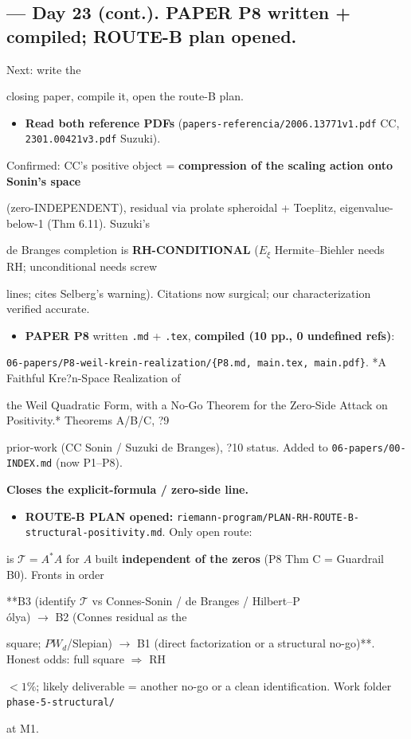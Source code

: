 \documentclass[10pt]{article}
\begin{document}
\subsection*{ --- Day 23 (cont.). PAPER P8 written + compiled; ROUTE-B plan opened.}
Next: write the\par
closing paper, compile it, open the route-B plan.\par
\begin{itemize}
\item \textbf{Read both reference PDFs} (\texttt{papers-referencia/2006.13771v1.pdf} CC, \texttt{2301.00421v3.pdf} Suzuki).
\end{itemize}
  Confirmed: CC's positive object = \textbf{compression of the scaling action onto Sonin's space}\par
  (zero-INDEPENDENT), residual via prolate spheroidal + Toeplitz, eigenvalue-below-1 (Thm 6.11). Suzuki's\par
  de Branges completion is \textbf{RH-CONDITIONAL} ($E_\xi$ Hermite--Biehler needs RH; unconditional needs screw\par
  lines; cites Selberg's warning). Citations now surgical; our characterization verified accurate.\par
\begin{itemize}
\item \textbf{PAPER P8} written \texttt{.md} + \texttt{.tex}, \textbf{compiled (10 pp., 0 undefined refs)}:
\end{itemize}
  \texttt{06-papers/P8-weil-krein-realization/\{P8.md, main.tex, main.pdf\}}. *A Faithful Kre?n-Space Realization of\par
  the Weil Quadratic Form, with a No-Go Theorem for the Zero-Side Attack on Positivity.* Theorems A/B/C, ?9\par
  prior-work (CC Sonin / Suzuki de Branges), ?10 status. Added to \texttt{06-papers/00-INDEX.md} (now P1--P8).\par
  \textbf{Closes the explicit-formula / zero-side line.}\par
\begin{itemize}
\item \textbf{ROUTE-B PLAN opened:} \texttt{riemann-program/PLAN-RH-ROUTE-B-structural-positivity.md}. Only open route:
\end{itemize}
  is $\mathcal T=A^*A$ for $A$ built \textbf{independent of the zeros} (P8 Thm C = Guardrail B0). Fronts in order\par
  **B3 (identify $\mathcal T$ vs Connes-Sonin / de Branges / Hilbert--P\\\'olya) \ensuremath{\to} B2 (Connes residual as the\par
  square; $PW_d$/Slepian) \ensuremath{\to} B1 (direct factorization or a structural no-go)**. Honest odds: full square \ensuremath{\Rightarrow} RH\par
  $<1\%$; likely deliverable = another no-go or a clean identification. Work folder \texttt{phase-5-structural/}\par
  at M1.\par
\end{document}
